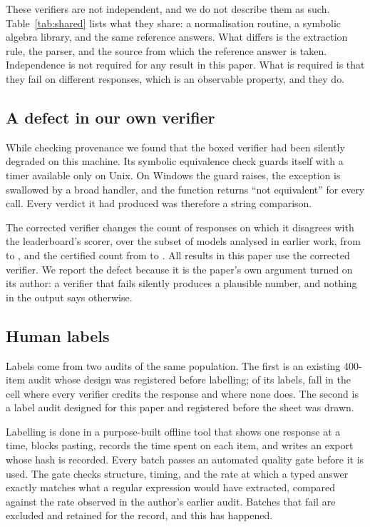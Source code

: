 These verifiers are not independent, and we do not describe them as such.
Table~\ref{tab:shared} lists what they share: a normalisation routine, a symbolic algebra
library, and the same reference answers. What differs is the extraction rule, the parser, and
the source from which the reference answer is taken. Independence is not required for any
result in this paper. What is required is that they fail on different responses, which is an
observable property, and they do.

\subsection{A defect in our own verifier}

While checking provenance we found that the boxed verifier had been silently degraded on this
machine. Its symbolic equivalence check guards itself with a timer available only on Unix. On
Windows the guard raises, the exception is swallowed by a broad handler, and the function
returns ``not equivalent'' for every call. Every verdict it had produced was therefore a
string comparison.

The corrected verifier changes the count of responses on which it disagrees with the
leaderboard's scorer, over the subset of models analysed in earlier work, from
\DisagreeSbEmSeventeenString{} to \DisagreeSbEmSeventeen{}, and the certified count from
\AnchorStringCombined{} to \AnchorSympyCombined{}. All results in this paper use the
corrected verifier. We report the defect because it is the paper's own argument turned on
its author: a verifier that fails silently produces a plausible number, and nothing in the
output says otherwise.

\subsection{Human labels}

Labels come from two audits of the same population. The first is an existing 400-item audit
whose design was registered before labelling; of its labels, \AuditNAgreeAll{} fall in the
cell where every verifier credits the response and \AuditNRejectAll{} where none does. The
second is a \AuditBudget{} label audit designed for this paper and registered before the sheet
was drawn.

Labelling is done in a purpose-built offline tool that shows one response at a time, blocks
pasting, records the time spent on each item, and writes an export whose hash is recorded.
Every batch passes an automated quality gate before it is used. The gate checks structure,
timing, and the rate at which a typed answer exactly matches what a regular expression would
have extracted, compared against the rate observed in the author's earlier audit. Batches that
fail are excluded and retained for the record, and this has happened.

